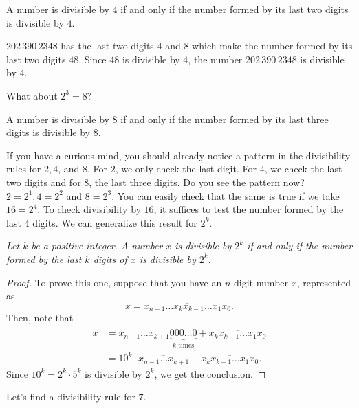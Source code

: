 \documentclass{subfile}
\begin{document}
\begin{proposition}[Divisibility by $4$]
	A number is divisible by $4$ if and only if the number formed by its last two digits is divisible by $4$.
\end{proposition}

\begin{example}
	$202\, 390\, 2348$ has the last two digits $4$ and $8$ which make the number formed by its last two digits $48$. Since $48$ is divisible by $4$, the number $202\, 390\, 2348$ is divisible by $4$.
\end{example}

What about $2^3=8$?

\begin{proposition}[Divisibility by $8$]
	A number is divisible by $8$ if and only if the number formed by its last three digits is divisible by $8$.
\end{proposition}

If you have a curious mind, you should already notice a pattern in the divisibility rules for $2,4$, and $8$. For $2$, we only check the last digit. For $4$, we check the last two digits and for $8$, the last three digits. Do you see the pattern now? $2=2^1,4=2^2$ and $8=2^3$. You can easily check that the same is true if we take $16=2^4$. To check divisibility by $16$, it suffices to test the number formed by the last $4$ digits. We can generalize this result for $2^k$.

\begin{theorem}[Divisibility by $2^k$]\slshape
	Let $k$ be a positive integer. A number $x$ is divisible by $2^k$ if and only if the number formed by the last $k$ digits of $x$ is divisible by $2^k$.
\end{theorem}

\begin{proof}
	To prove this one, suppose that you have an $n$ digit number $x$, represented as $$x = \overline{x_{n-1} \dots x_k x_{k-1} \dots x_1 x_0 }.$$ Then, note that
	\begin{align*}
		x &= \overline{x_{n-1} \dots x_{k+1} \underbrace{000\dots 0}_{k \text{ times}}} + \overline{x_k x_{k-1} \dots x_1 x_0} \\
		&= 10^k \cdot \overline{x_{n-1} \dots x_{k+1}} +  \overline{x_k x_{k-1} \dots x_1 x_0}.
	\end{align*}
	Since $10^k=2^k \cdot 5^k$ is divisible by $2^k$, we get the conclusion.
\end{proof}

Let's find a divisibility rule for $7$.
\end{document}
